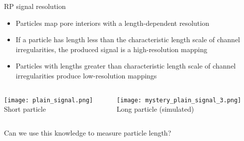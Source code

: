 \begin{frame}[c]{RP signal resolution}
	
	\vspace{-.1in}
	\begin{itemize}
		\item Particles map pore interiors with a length-dependent resolution
		\item If a particle has length less than the characteristic length scale of channel irregularities, the produced signal is a high-resolution mapping
		\item Particles with lengths greater than characteristic length scale of channel irregularities produce low-resolution mappings
	\end{itemize}
	
	
	
	\begin{columns}[t]
		
	
		\begin{column}[T]{2.25in}
			{\centering
				\texttt{[image: plain\_signal.png]} \\
				Short particle \\
			}
		\end{column}
		  
		\begin{column}[T]{2.25in}
			{\centering
				\texttt{[image: mystery\_plain\_signal\_3.png]} \\
				Long particle (simulated) \\
			}
		\end{column}

	\end{columns}
	\vspace{.2in}
	{\large \textcolor{negativered}{Can we use this knowledge to measure particle length?}}


	
	
	
	

\end{frame}



